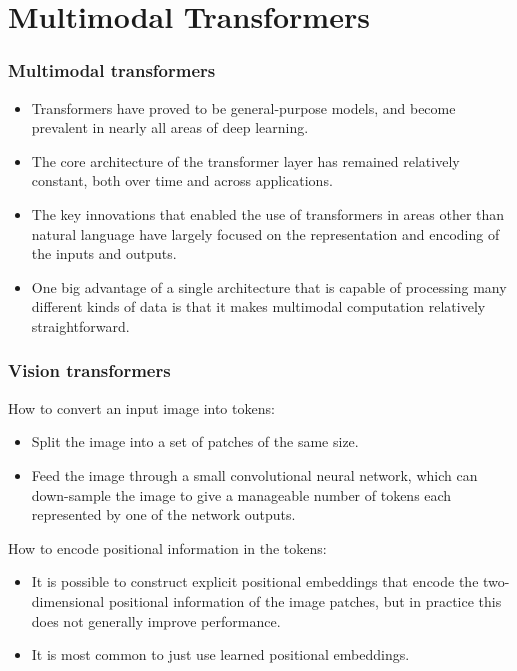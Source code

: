 \documentclass{beamer}
\begin{document}
\section{Multimodal Transformers}

\begin{frame}
    \frametitle{Multimodal transformers}
    \begin{itemize}
        \item Transformers have proved to be general-purpose models, and become prevalent in nearly all areas of deep learning.
        \item The core architecture of the transformer layer has remained relatively constant, both over time and across applications.
        \item The key innovations that enabled the use of transformers in areas other than natural language have largely focused on the representation and encoding of the inputs and outputs.
        \item One big advantage of a single architecture that is capable of processing many different kinds of data is that it makes multimodal computation relatively straightforward.
    \end{itemize}
\end{frame}

\begin{frame}
    \frametitle{Vision transformers}
    How to convert an input image into tokens:
    \begin{itemize}
        \item Split the image into a set of patches of the same size.
        \item Feed the image through a small convolutional neural network, which can down-sample the image to give a manageable number of tokens each represented by one of the network outputs.
    \end{itemize}
    How to encode positional information in the tokens:
    \begin{itemize}
        \item It is possible to construct explicit positional embeddings that encode the two-dimensional positional information of the image patches, but in practice this does not generally improve performance.
        \item It is most common to just use learned positional embeddings.
    \end{itemize}
\end{frame}
\end{document}
